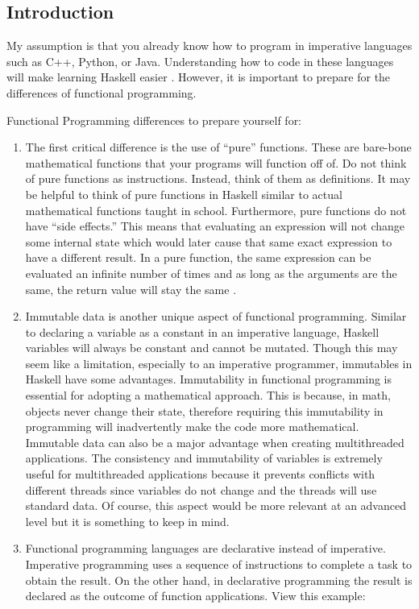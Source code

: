 \documentclass{article}
\begin{document}
\subsection{Introduction}
\medskip\noindent
My assumption is that you already know how to program in imperative languages such as C++, Python, or Java. Understanding how to code in these languages will make learning Haskell easier \cite{ID}. However, it is important to prepare for the differences of functional programming.

\medskip\noindent
Functional Programming differences to prepare yourself for:
\begin{enumerate}
  \item The first critical difference is the use of “pure” functions. These are bare-bone mathematical functions that your programs will function off of. Do not think of pure functions as instructions. Instead, think of them as definitions. It may be helpful to think of pure functions in Haskell similar to actual mathematical functions taught in school. Furthermore, pure functions do not have “side effects.” This means that evaluating an expression will not change some internal state which would later cause that same exact expression to have a different result. In a pure function, the same expression can be evaluated an infinite number of times and as long as the arguments are the same, the return value will stay the same \cite{HP}.
  
  \item Immutable data is another unique aspect of functional programming. Similar to declaring a variable as a constant in an imperative language, Haskell variables will always be constant and cannot be mutated. Though this may seem like a limitation, especially to an imperative programmer, immutables in Haskell have some advantages. Immutability in functional programming is essential for adopting a mathematical approach. This is because, in math, objects never change their state, therefore requiring this immutability in programming will inadvertently make the code more mathematical. Immutable data can also be a major advantage when creating multithreaded applications. The consistency and immutability of variables is extremely useful for multithreaded applications because it prevents conflicts with different threads since variables do not change and the threads will use standard data. Of course, this aspect would be more relevant at an advanced level but it is something to keep in mind.
  
  \item Functional programming languages are declarative instead of imperative. Imperative programming uses a sequence of instructions to complete a task to obtain the result. On the other hand, in declarative programming the result is declared as the outcome of function applications. View this example:


\end{enumerate}
\end{document}
